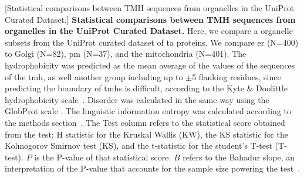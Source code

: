 \begin{table}[htbp]
\centering
{}[Statistical comparisons between TMH sequences from organelles in the UniProt Curated Dataset.]
{\textbf{Statistical comparisons between TMH sequences from organelles in the UniProt Curated Dataset.}
Here, we compare a organelle subsets from the UniProt curated dataset of \gls{ta} proteins.
We compare \gls{er} (N=400) to Golgi (N=82), \gls{pm} (N=37), and the mitochondria (N=401).
The hydrophobicity was predicted as the mean average of the values of the sequences of the \gls{tmh}, as well another group including up to $\pm$5 flanking residues, since predicting the boundary of \gls{tmh}s is difficult, according to the Kyte \& Doolittle hydrophobicity scale~\cite{Kyte1982}.
Disorder was calculated in the same way using the GlobProt scale \cite{Linding2003}.
The linguistic information entropy was calculated according to the methods section~\cite{Shannon1948}.
The Test column refers to the statistical score obtained from the test; H statistic for the Kruskal Wallis (KW), the KS statistic for the Kolmogorov Smirnov test (KS), and the t-statistic for the student's T-test (T-test).
$P$ is the P-value of that statistical score.
$B$ refers to the Bahadur slope, an interpretation of the P-value that accounts for the sample size powering the test~\cite{Bahadur1967, Bahadur1971}.}
	\tiny


\end{table}
